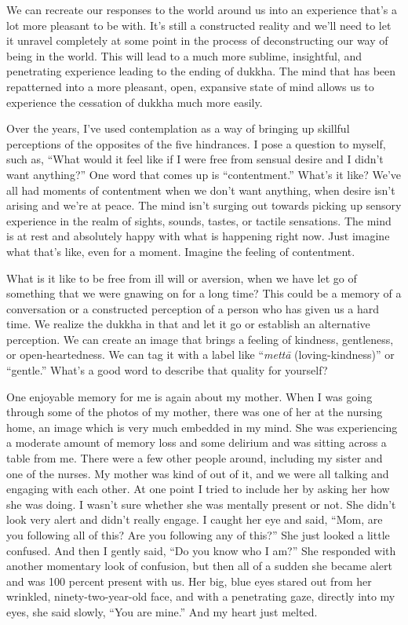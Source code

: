 We can recreate our responses to the world around us into an experience that's a lot more pleasant to be with. It's still a constructed reality and we'll need to let it unravel completely at some point in the process of deconstructing our way of being in the world. This will lead to a much more sublime, insightful, and penetrating experience leading to the ending of dukkha. The mind that has been repatterned into a more pleasant, open, expansive state of mind allows us to experience the cessation of dukkha much more easily.

Over the years, I've used contemplation as a way of bringing up skillful perceptions of the opposites of the five hindrances. I pose a question to myself, such as, ``What would it feel like if I were free from sensual desire and I didn't want anything?'' One word that comes up is ``contentment.'' What's it like? We've all had moments of contentment when we don't want anything, when desire isn't arising and we're at peace. The mind isn't surging out towards picking up sensory experience in the realm of sights, sounds, tastes, or tactile sensations. The mind is at rest and absolutely happy with what is happening right now. Just imagine what that's like, even for a moment. Imagine the feeling of contentment.

What is it like to be free from ill will or aversion, when we have let go of something that we were gnawing on for a long time? This could be a memory of a conversation or a constructed perception of a person who has given us a hard time. We realize the dukkha in that and let it go or establish an alternative perception. We can create an image that brings a feeling of kindness, gentleness, or open-heartedness. We can tag it with a label like ``\emph{mettā} (loving-kindness)'' or ``gentle.'' What's a good word to describe that quality for yourself?

One enjoyable memory for me is again about my mother. When I was going through some of the photos of my mother, there was one of her at the nursing home, an image which is very much embedded in my mind. She was experiencing a moderate amount of memory loss and some delirium and was sitting across a table from me. There were a few other people around, including my sister and one of the nurses. My mother was kind of out of it, and we were all talking and engaging with each other. At one point I tried to include her by asking her how she was doing. I wasn't sure whether she was mentally present or not. She didn't look very alert and didn't really engage. I caught her eye and said, ``Mom, are you following all of this? Are you following any of this?'' She just looked a little confused. And then I gently said, ``Do you know who I am?'' She responded with another momentary look of confusion, but then all of a sudden she became alert and was 100 percent present with us. Her big, blue eyes stared out from her wrinkled, ninety-two-year-old face, and with a penetrating gaze, directly into my eyes, she said slowly, ``You are mine.'' And my heart just melted.

